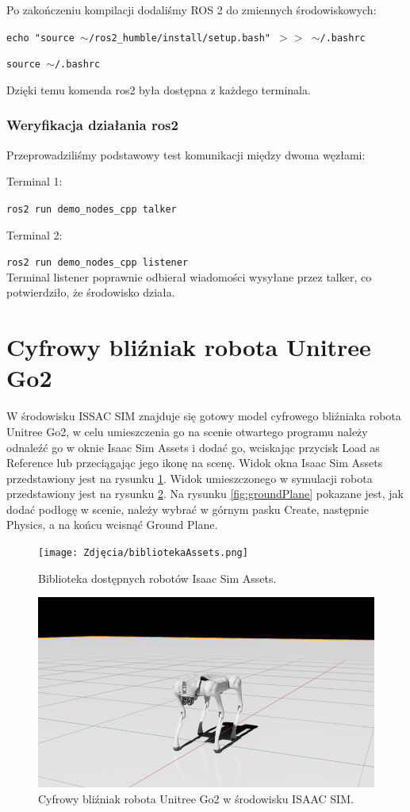 \documentclass[12pt]{article}
\begin{document}
Po zakończeniu kompilacji dodaliśmy ROS 2 do zmiennych środowiskowych:

\texttt{echo "source $\sim$/ros2\_humble/install/setup.bash" $>>$ $\sim$/.bashrc}

\texttt{source $\sim$/.bashrc}

Dzięki temu komenda ros2 była dostępna z każdego terminala.

\subsubsection{Weryfikacja działania ros2 }

Przeprowadziliśmy podstawowy test komunikacji między dwoma węzłami:

Terminal 1:

\texttt{ros2 run demo\_nodes\_cpp talker}


Terminal 2:

\texttt{ros2 run demo\_nodes\_cpp listener}
\\
Terminal listener poprawnie odbierał wiadomości wysyłane przez talker, co potwierdziło, że środowisko działa.

\newpage
\section{Cyfrowy bliźniak robota Unitree Go2}

W środowisku ISSAC SIM znajduje się gotowy model cyfrowego bliźniaka robota Unitree Go2, w celu umieszczenia go na scenie otwartego programu należy odnaleźć go w oknie Isaac Sim Assets i dodać go, wciskając przycisk Load as Reference lub przeciągając jego ikonę na scenę. Widok okna Isaac Sim Assets przedstawiony jest na rysunku \ref{fig:Assets}. Widok umieszczonego w symulacji robota przedstawiony jest na rysunku \ref{fig:cyfrowyBlizniak}. Na rysunku \ref{fig:groundPlane} pokazane jest, jak dodać podłogę w scenie, należy wybrać w górnym pasku Create, następnie Physics,  a na końcu wcisnąć Ground Plane.  

\begin{figure}[h]
    \centering
    \texttt{[image: Zdjęcia/bibliotekaAssets.png]}
    \caption{Biblioteka dostępnych robotów Isaac Sim Assets.}
    \label{fig:Assets}
\end{figure}



\begin{figure}[h]
    \centering
    \includegraphics[width=0.7\linewidth]{Zdjęcia/cyfrowyBlizniakUnitryGo2.png}
    \caption{Cyfrowy bliźniak robota Unitree Go2 w środowisku ISAAC SIM.}
    \label{fig:cyfrowyBlizniak}
\end{figure}
\end{document}
